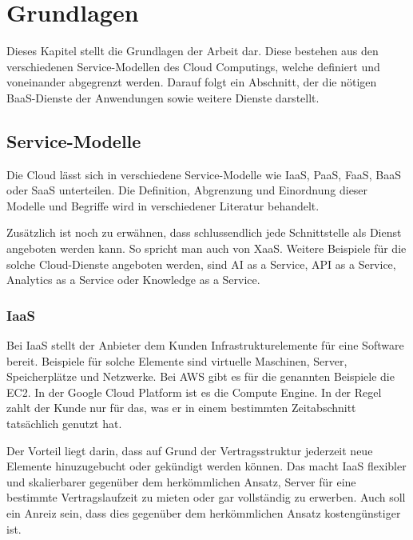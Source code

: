 \chapter{Grundlagen}\label{kap2}

Dieses Kapitel stellt die Grundlagen der Arbeit dar. Diese bestehen aus den verschiedenen Service-Modellen des Cloud Computings, welche definiert und voneinander abgegrenzt werden. Darauf folgt ein Abschnitt, der die nötigen \ac{BaaS}-Dienste der Anwendungen sowie weitere Dienste darstellt.

\section{Service-Modelle}

Die Cloud lässt sich in verschiedene Service-Modelle wie \ac{IaaS}, \ac{PaaS}, \ac{FaaS}, \acf{BaaS} oder \ac{SaaS} unterteilen. Die Definition, Abgrenzung und Einordnung dieser Modelle und Begriffe wird in verschiedener Literatur \autocite{jiang2020overview}\autocite{kumar2019serverless}\autocite{dahunsi2021commercial} behandelt.

Zusätzlich ist noch zu erwähnen, dass schlussendlich jede Schnittstelle als Dienst angeboten werden kann. So spricht man auch von \ac{XaaS}. Weitere Beispiele für die solche Cloud-Dienste angeboten werden, sind AI as a Service, API as a Service, Analytics as a Service oder Knowledge as a Service.

\subsection{\acl{IaaS}}

Bei \acf{IaaS} stellt der Anbieter dem Kunden Infrastrukturelemente für eine Software bereit. Beispiele für solche Elemente sind virtuelle Maschinen, Server, Speicherplätze und Netzwerke. Bei \ac{AWS} gibt es für die genannten Beispiele die \ac{EC2}. In der Google Cloud Platform ist es die Compute Engine. In der Regel zahlt der Kunde nur für das, was er in einem bestimmten Zeitabschnitt tatsächlich genutzt hat.

Der Vorteil liegt darin, dass auf Grund der Vertragsstruktur jederzeit neue Elemente hinuzugebucht oder gekündigt werden können. Das macht \acl{IaaS} flexibler und skalierbarer gegenüber dem herkömmlichen Ansatz, Server für eine bestimmte Vertragslaufzeit zu mieten oder gar vollständig zu erwerben. Auch soll ein Anreiz sein, dass dies gegenüber dem herkömmlichen Ansatz kostengünstiger ist.

